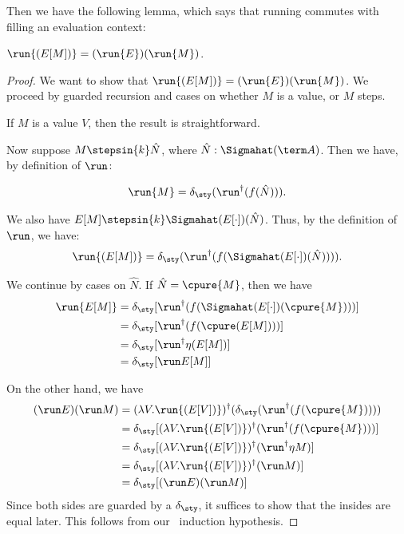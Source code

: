 Then we have the following lemma, which says that running commutes with filling
an evaluation context:
%
\begin{lemma}\label{lem:run-fill}
  $\run{(E[M])} = (\run{E})(\run{M})$.
\end{lemma}
\begin{proof}
    We want to show that $\run{(E[M])} = (\run{E})(\run{M})$. We proceed by
    guarded recursion and cases on whether $M$ is a value, or $M$ steps.

    If $M$ is a value $V$, then the result is straightforward. 

    Now suppose $M \stepsin{k} \hat{N}$, where $\hat{N} : \Sigmahat(\term A)$.
    Then we have, by definition of $\run$:

    \begin{equation} 
        \run{M} = \delta_{\sty} (\run^{\dag} {(f(\hat{N}))}).
    \end{equation}

    We also have $E[M] \stepsin{k} \Sigmahat(E[\cdot])(\hat{N})$. Thus, by the
    definition of $\run$, we have:
    \begin{equation} 
        \run{(E[M])} = \delta_{\sty} (\run^{\dag} {(f (\Sigmahat(E[\cdot])(\hat{N})) )}).
    \end{equation}

    We continue by cases on $\hat{N}$. If $\hat{N} = \cpure{M}$, then we have
    \begin{align*}
        \run{E[M]}
        &= \delta_{\sty} [\run^{\dag} {(f (\Sigmahat(E[\cdot])(\cpure{M})) )}] \\
        &= \delta_{\sty} [\run^{\dag} {(f (\cpure(E[M])))}] \\
        &= \delta_{\sty} [\run^{\dag} {\eta (E[M])}] \\
        &= \delta_{\sty} [\run E[M]]
    \end{align*}

    On the other hand, we have
    \begin{align*}
        (\run E)(\run M) 
        &= (\lambda V. \run{(E[V])})^{\dag} (\delta_{\sty} (\run^{\dag} {(f(\cpure{M}))}) ) \\
        &= \delta_{\sty} [(\lambda V. \run{(E[V])})^{\dag} (\run^{\dag} {(f(\cpure{M}))})] \\
        &= \delta_{\sty} [(\lambda V. \run{(E[V])})^{\dag} (\run^{\dag} {\eta M})] \\
        &= \delta_{\sty} [(\lambda V. \run{(E[V])})^{\dag} (\run M)] \\
        &= \delta_{\sty} [(\run E) (\run M)]
    \end{align*}
    Since both sides are guarded by a $\delta_{\sty}$, it suffices to show that
    the insides are equal later. This follows from our \lob~induction
    hypothesis.


\end{proof}
